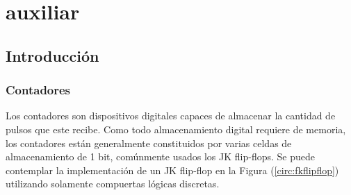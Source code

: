 

\section{auxiliar}
\tableofcontents

\subsection{Introducción}
\subsubsection{Contadores}
		Los contadores son dispositivos digitales capaces de almacenar la cantidad de pulsos que este recibe. Como todo almacenamiento digital requiere de memoria, los contadores están generalmente constituidos por varias celdas de almacenamiento de 1 bit, comúnmente usados los JK flip-flops. Se puede contemplar la implementación de un JK flip-flop en la Figura (\ref{circ:fkflipflop}) utilizando solamente compuertas lógicas discretas. 
		
